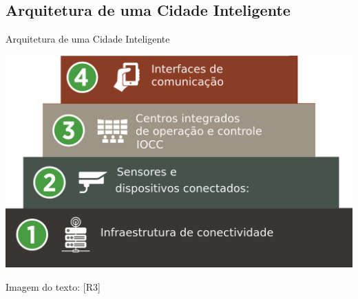 \documentclass{beamer}
\begin{document}
\subsection{Arquitetura de uma Cidade Inteligente}

\begin{frame}{Arquitetura de uma Cidade Inteligente}
\begin{center}
\includegraphics[width=.8\textwidth]{img/arquitetura.png}  
\end{center}
{\tiny{Imagem do texto: [R3]}}


\end{frame}
\end{document}
